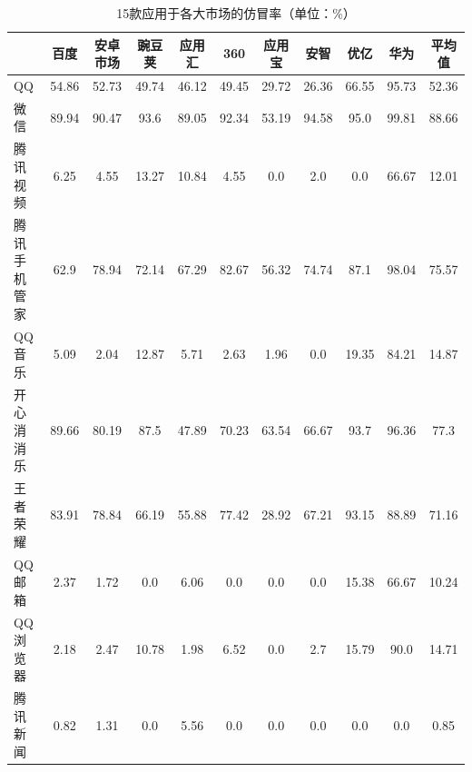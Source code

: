 \begin{table}[htbp]
    \renewcommand{\arraystretch}{1}
    \footnotesize
    \centering
    \caption{15款应用于各大市场的仿冒率（单位：\%）}
    \vspace{1mm}
    \begin{tabular}{l c c c c c c c c c c}
        \toprule
                                        & {\bf 百度} & {\bf 安卓市场} & {\bf 豌豆荚} & {\bf 应用汇} & {\bf 360} & {\bf 应用宝} & {\bf 安智} & {\bf 优亿} & {\bf 华为} & {平均值} \\
        \midrule
        QQ                              & 54.86      & 52.73          & 49.74        & 46.12        & 49.45     & 29.72        & 26.36      & 66.55      & 95.73      & 52.36    \\
        \rowcolor{gray!15} 微信         & 89.94      & 90.47          & 93.6         & 89.05        & 92.34     & 53.19        & 94.58      & 95.0       & 99.81      & 88.66    \\
        腾讯视频                        & 6.25       & 4.55           & 13.27        & 10.84        & 4.55      & 0.0          & 2.0        & 0.0        & 66.67      & 12.01    \\
        \rowcolor{gray!15} 腾讯手机管家 & 62.9       & 78.94          & 72.14        & 67.29        & 82.67     & 56.32        & 74.74      & 87.1       & 98.04      & 75.57    \\
        QQ音乐                          & 5.09       & 2.04           & 12.87        & 5.71         & 2.63      & 1.96         & 0.0        & 19.35      & 84.21      & 14.87    \\
        \rowcolor{gray!15} 开心消消乐   & 89.66      & 80.19          & 87.5         & 47.89        & 70.23     & 63.54        & 66.67      & 93.7       & 96.36      & 77.3     \\
        王者荣耀                        & 83.91      & 78.84          & 66.19        & 55.88        & 77.42     & 28.92        & 67.21      & 93.15      & 88.89      & 71.16    \\
        \rowcolor{gray!15} QQ邮箱       & 2.37       & 1.72           & 0.0          & 6.06         & 0.0       & 0.0          & 0.0        & 15.38      & 66.67      & 10.24    \\
        QQ浏览器                        & 2.18       & 2.47           & 10.78        & 1.98         & 6.52      & 0.0          & 2.7        & 15.79      & 90.0       & 14.71    \\
        \rowcolor{gray!15} 腾讯新闻     & 0.82       & 1.31           & 0.0          & 5.56         & 0.0       & 0.0          & 0.0        & 0.0        & 0.0        & 0.85     \\

\end{tabular}
\end{table}
